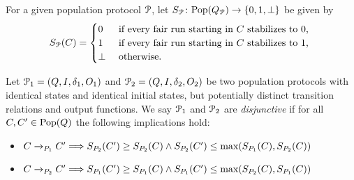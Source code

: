 
For a given population protocol $\mathcal{P}$, let 
$S_{\mathcal{P}} \colon \mathrm{Pop}(Q_{\mathcal{P}}) \rightarrow \left\{0, 1, \bot\right\}$ be given by
$$S_{\mathcal{P}}(C) = \begin{cases}
         0 & \text{ if  every fair run starting in $C$ stabilizes to $0$, } \\
         1 & \text{ if every fair run starting in $C$ stabilizes to $1$, } \\
         \bot & \text{ otherwise. }
         \end{cases}
$$

Let $\mathcal{P}_1 = (Q, I, \delta_1, O_1)$ and $\mathcal{P}_2 = (Q, I, \delta_2, O_2)$ 
be two population protocols with identical states and identical initial states, 
but potentially distinct transition relations and output functions. 
We say $\mathcal{P}_1$ and $\mathcal{P}_2$ are \emph{disjunctive} if for all $C, C' \in \mathrm{Pop}(Q)$
the following implications hold:
\begin{itemize}
	\item $C \xrightarrow{}_{P_1} C' \Longrightarrow S_{P_2}(C') \geq S_{P_2}(C) \land
	       S_{P_2}(C') \leq \text{max}(S_{P_1}(C), S_{P_2}(C))$
	\item $C \xrightarrow{}_{P_2} C' \Longrightarrow S_{P_1}(C') \geq S_{P_1}(C) \land
	       S_{P_1}(C') \leq \text{max}(S_{P_2}(C), S_{P_1}(C))$
\end{itemize}

